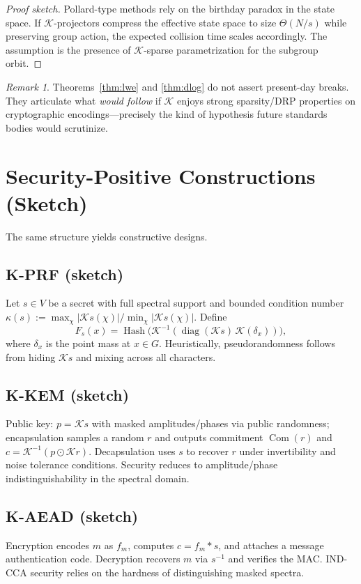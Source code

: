 \documentclass[11pt]{article}
\theoremstyle{plain}
\theoremstyle{definition}
\theoremstyle{remark}
\newtheorem{remark}[theorem]{Remark}
\DeclareMathOperator{\diag}{diag}
\begin{document}
\begin{proof}[Proof sketch]
Pollard-type methods rely on the birthday paradox in the state space. If $\mathcal{K}$-projectors compress the effective state space to size $\Theta(N/s)$ while preserving group action, the expected collision time scales accordingly. The assumption is the presence of $\mathcal{K}$-sparse parametrization for the subgroup orbit.
\end{proof}
\begin{remark}
Theorems~\ref{thm:lwe} and \ref{thm:dlog} do not assert present-day breaks. They articulate what \emph{would follow} if $\mathcal{K}$ enjoys strong sparsity/DRP properties on cryptographic encodings---precisely the kind of hypothesis future standards bodies would scrutinize.
\end{remark}
\section{Security-Positive Constructions (Sketch)}
The same structure yields constructive designs.
\subsection{K-PRF (sketch)}
Let $s \in V$ be a secret with full spectral support and bounded condition number $\kappa(s) := \max_{\chi} |\mathcal{K}s(\chi)| / \min_{\chi} |\mathcal{K}s(\chi)|$. Define
\[
    F_s(x) = \operatorname{Hash}\bigl(\mathcal{K}^{-1}(\diag(\mathcal{K}s)\, \mathcal{K}(\delta_x))\bigr),
\]
where $\delta_x$ is the point mass at $x \in G$. Heuristically, pseudorandomness follows from hiding $\mathcal{K}s$ and mixing across all characters.
\subsection{K-KEM (sketch)}
Public key: $p = \mathcal{K}s$ with masked amplitudes/phases via public randomness; encapsulation samples a random $r$ and outputs commitment $\operatorname{Com}(r)$ and $c = \mathcal{K}^{-1}(p \odot \mathcal{K}r)$. Decapsulation uses $s$ to recover $r$ under invertibility and noise tolerance conditions. Security reduces to amplitude/phase indistinguishability in the spectral domain.
\subsection{K-AEAD (sketch)}
Encryption encodes $m$ as $f_m$, computes $c = f_m \ast s$, and attaches a message authentication code. Decryption recovers $m$ via $s^{-1}$ and verifies the MAC. IND-CCA security relies on the hardness of distinguishing masked spectra.
\end{document}
